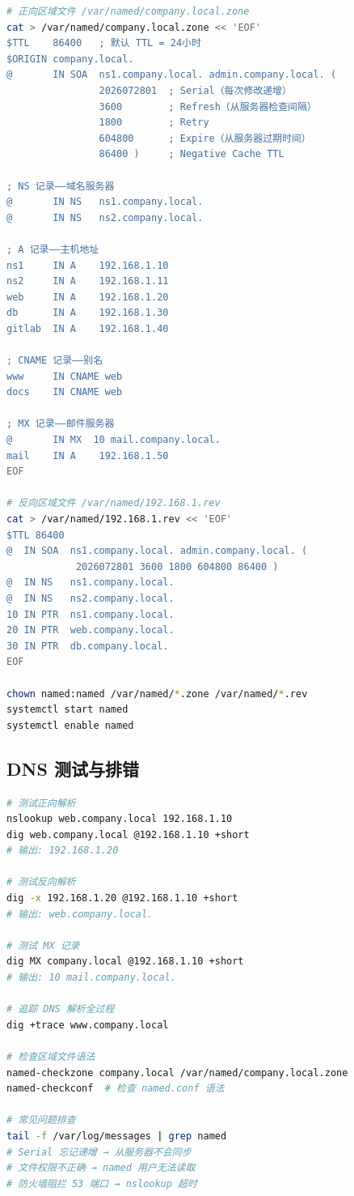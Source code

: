 \documentclass[12pt,UTF8]{ctexbook}
\begin{document}
\begin{lstlisting}[language=bash]
# 正向区域文件 /var/named/company.local.zone
cat > /var/named/company.local.zone << 'EOF'
$TTL    86400   ; 默认 TTL = 24小时
$ORIGIN company.local.
@       IN SOA  ns1.company.local. admin.company.local. (
                2026072801  ; Serial（每次修改递增）
                3600        ; Refresh（从服务器检查间隔）
                1800        ; Retry
                604800      ; Expire（从服务器过期时间）
                86400 )     ; Negative Cache TTL

; NS 记录——域名服务器
@       IN NS   ns1.company.local.
@       IN NS   ns2.company.local.

; A 记录——主机地址
ns1     IN A    192.168.1.10
ns2     IN A    192.168.1.11
web     IN A    192.168.1.20
db      IN A    192.168.1.30
gitlab  IN A    192.168.1.40

; CNAME 记录——别名
www     IN CNAME web
docs    IN CNAME web

; MX 记录——邮件服务器
@       IN MX  10 mail.company.local.
mail    IN A    192.168.1.50
EOF

# 反向区域文件 /var/named/192.168.1.rev
cat > /var/named/192.168.1.rev << 'EOF'
$TTL 86400
@  IN SOA  ns1.company.local. admin.company.local. (
            2026072801 3600 1800 604800 86400 )
@  IN NS   ns1.company.local.
@  IN NS   ns2.company.local.
10 IN PTR  ns1.company.local.
20 IN PTR  web.company.local.
30 IN PTR  db.company.local.
EOF

chown named:named /var/named/*.zone /var/named/*.rev
systemctl start named
systemctl enable named
\end{lstlisting}

\subsection{DNS 测试与排错}

\begin{lstlisting}[language=bash]
# 测试正向解析
nslookup web.company.local 192.168.1.10
dig web.company.local @192.168.1.10 +short
# 输出: 192.168.1.20

# 测试反向解析
dig -x 192.168.1.20 @192.168.1.10 +short
# 输出: web.company.local.

# 测试 MX 记录
dig MX company.local @192.168.1.10 +short
# 输出: 10 mail.company.local.

# 追踪 DNS 解析全过程
dig +trace www.company.local

# 检查区域文件语法
named-checkzone company.local /var/named/company.local.zone
named-checkconf  # 检查 named.conf 语法

# 常见问题排查
tail -f /var/log/messages | grep named
# Serial 忘记递增 → 从服务器不会同步
# 文件权限不正确 → named 用户无法读取
# 防火墙阻拦 53 端口 → nslookup 超时
\end{lstlisting}
\end{document}
